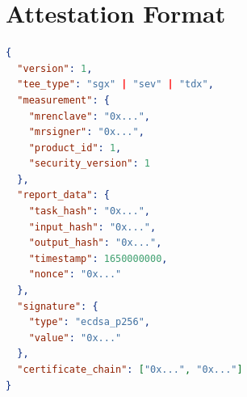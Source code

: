\section{Attestation Format}


\begin{lstlisting}[language=json,caption=TEE Attestation Structure]
{
  "version": 1,
  "tee_type": "sgx" | "sev" | "tdx",
  "measurement": {
    "mrenclave": "0x...",
    "mrsigner": "0x...",
    "product_id": 1,
    "security_version": 1
  },
  "report_data": {
    "task_hash": "0x...",
    "input_hash": "0x...",
    "output_hash": "0x...",
    "timestamp": 1650000000,
    "nonce": "0x..."
  },
  "signature": {
    "type": "ecdsa_p256",
    "value": "0x..."
  },
  "certificate_chain": ["0x...", "0x..."]
}
\end{lstlisting}

